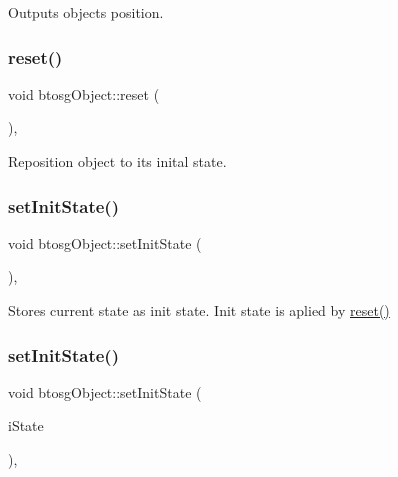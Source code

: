 Outputs object\textquotesingle{}s position. \mbox{\label{classbtosgObject_a93983f9180dd0672f8779cf2baa78580}} 
\subsubsection{\texorpdfstring{reset()}{reset()}}
{\footnotesize\ttfamily void btosg\+Object\+::reset (\begin{DoxyParamCaption}{ }\end{DoxyParamCaption})\hspace{0.3cm}{\ttfamily [inline]}, {\ttfamily [inherited]}}

Reposition object to its inital state. \mbox{\label{classbtosgObject_ad1508a0ce28cfac83e5f0ff6245f91b5}} 
\subsubsection{\texorpdfstring{set\+Init\+State()}{setInitState()}\hspace{0.1cm}{\footnotesize\ttfamily [1/2]}}
{\footnotesize\ttfamily void btosg\+Object\+::set\+Init\+State (\begin{DoxyParamCaption}{ }\end{DoxyParamCaption})\hspace{0.3cm}{\ttfamily [inline]}, {\ttfamily [inherited]}}

Stores current state as init state. Init state is aplied by \hyperlink{classbtosgObject_a93983f9180dd0672f8779cf2baa78580}{reset()} \mbox{\label{classbtosgObject_a6ceb08e59ee95acaaef389ee198d2b56}} 
\subsubsection{\texorpdfstring{set\+Init\+State()}{setInitState()}\hspace{0.1cm}{\footnotesize\ttfamily [2/2]}}
{\footnotesize\ttfamily void btosg\+Object\+::set\+Init\+State (\begin{DoxyParamCaption}\item[{bt\+Transform}]{i\+State }\end{DoxyParamCaption})\hspace{0.3cm}{\ttfamily [inline]}, {\ttfamily [inherited]}}

